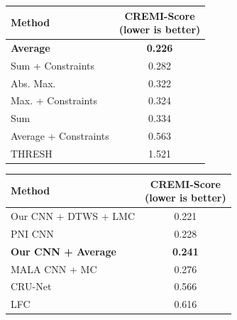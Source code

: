 \begin{figure}[t]
        \centering
\begin{minipage}[t]{0.48\textwidth}
    \centering
    \scriptsize
        \begin{tabular}[t]{l|c}
         Method & \makecell{CREMI-Score \\(lower is better)} \\ \midrule 
\textbf{\algname{}} \textbf{Average}& \textbf{0.226}  \\
\algname{} Sum + Constraints \cite{levinkov2017comparative} & 0.282 \\
\algname{} Abs. Max. \cite{wolf2018mutex} & 0.322 \\
\algname{} Max. + Constraints & 0.324 \\
\algname{} Sum \cite{keuper2015efficient} & 0.334 \\
\algname{} Average + Constraints & 0.563 \\
THRESH & 1.521 \\ 
        \end{tabular}
    \label{tab:results_cremi_train}
\end{minipage}\hfill
\begin{minipage}[t]{0.48\textwidth}
    \centering
    \scriptsize
        \begin{tabular}[t]{l|c}
        Method & \makecell{CREMI-Score \\(lower is better)}  \\ \midrule
Our CNN + DTWS + LMC &  0.221\\
PNI CNN \cite{lee2017superhuman} & 0.228 \\
\textbf{Our CNN + \algname{} Average} & \textbf{0.241} \\
MALA CNN + MC \cite{funke2018large} & 0.276 \\
CRU-Net \cite{zeng2017deepem3d} & 0.566  \\
LFC \cite{parag2017anisotropic} & 0.616  \\
        \end{tabular}
        \vspace*{0.99em}
    \label{tab:results_cremi_test}
\end{minipage}
\end{figure}




